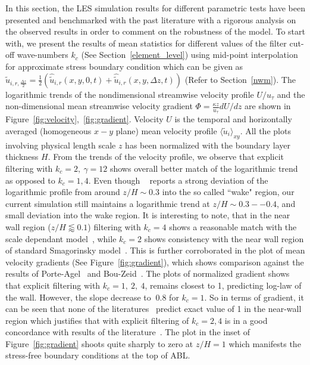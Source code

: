 \documentclass[times]{fldauth}
\begin{document}
In this section, the LES simulation results for different parametric tests have been presented and benchmarked with the past literature with a rigorous analysis on the observed results in order to comment on the robustness of the model. To start with, we present the results of mean statistics for different values of the filter cut-off wave-numbers $k_{c}$ (See Section~\ref{element_level}) using mid-point interpolation for approximate stress boundary condition which can be given as $\widehat{\widetilde{u}}_{i,r,\frac{\Delta z}{2}} = \frac{1}{2} (\widehat{\widetilde{u}}_{i,r}(x,y,0,t) + \widehat{\widetilde{u}}_{i,r}(x,y,\Delta z,t))$ (Refer to Section~\ref{nwm}). The logarithmic trends of the nondimensional streamwise velocity profile ${U}/{u_{\tau}}$ and the non-dimensional mean streamwise velocity gradient $\Phi = \frac{\kappa z}{u_{\tau}}dU/dz$ are shown in Figure~\ref{fig:velocity},~\ref{fig:gradient}. Velocity $U$ is the temporal and horizontally averaged (homogeneous $x-y$ plane) mean velocity profile $\langle\widetilde{u}_{i}\rangle_{xy}$. All the plots involving physical length scale $z$ has been normalized with the boundary layer thickness $H$. From the trends of the velocity profile, we observe that explicit filtering with $k_c = 2, \  \gamma = 12$ shows overall better match of the logarithmic trend as opposed to $k_c = 1, 4$. Even though ~\cite{porte1fun} reports a strong deviation of the logarithmic profile from around $z/H \sim 0.3$ into the so called ``wake" region, our current simulation still maintains a logarithmic trend at  $z/H \sim 0.3--0.4$, and small deviation into the wake region. It is interesting to note, that in the near wall region ($z/H \lessapprox 0.1$) filtering with $k_c = 4$ shows a reasonable match with the scale dependant model~\cite{porte1fun}, while $k_c = 2$ shows consistency with the near wall region of standard Smagorinsky model~\cite{porte1fun}. This is further corroborated in the plot of mean velocity gradients (See Figure~\ref{fig:gradient}), which shows comparison against the results of Porte-Agel~\cite{porte1fun} and Bou-Zeid~\cite{bou1}. The plots of normalized gradient shows that explicit filtering with $k_c = 1, \ 2, \ 4$, remains closest to 1, predicting log-law of the wall. However, the slope decrease to $~0.8$ for $k_c = 1$. So in terms of gradient, it can be seen that none of the literatures~\cite{porte1fun,bou1} predict exact value of 1 in the near-wall region which justifies that with explicit filtering of $k_c = 2, 4$ is in a good concordance with results of the literature~\cite{porte1fun,bou1}. The plot in the inset of Figure~\ref{fig:gradient} shoots quite sharply to zero at $z/H = 1$ which manifests the stress-free boundary conditions at the top of ABL. \\
\end{document}
